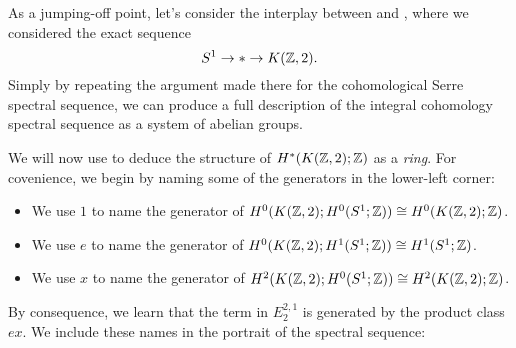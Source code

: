 \begin{example}\label{CohomCPinftySSeq}
As a jumping-off point, let's consider the interplay between  and , where we considered the exact sequence \[S^1 \to * \to K(\mathbb Z, 2).\]
Simply by repeating the argument made there for the cohomological Serre spectral sequence, we can produce a full description of the integral cohomology spectral sequence as a system of abelian groups.

We will now use  to deduce the structure of $H^*(K(\mathbb Z, 2); \mathbb Z)$ as a \emph{ring}.
For covenience, we begin by naming some of the generators in the lower-left corner:
\begin{itemize}
    \item We use $1$ to name the generator of $H^0(K(\mathbb Z, 2); H^0(S^1; \mathbb Z)) \cong H^0(K(\mathbb Z, 2); \mathbb Z)$.
    \item We use $e$ to name the generator of $H^0(K(\mathbb Z, 2); H^1(S^1; \mathbb Z)) \cong H^1(S^1; \mathbb Z)$.
    \item We use $x$ to name the generator of $H^2(K(\mathbb Z, 2); H^0(S^1; \mathbb Z)) \cong H^2(K(\mathbb Z, 2); \mathbb Z)$.
\end{itemize}
By consequence, we learn that the term in $E_2^{2, 1}$ is generated by the product class $ex$.
We include these names in the portrait of the spectral sequence:


\end{example}
